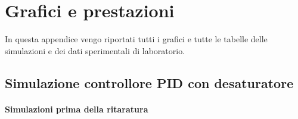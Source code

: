 \section{Grafici e prestazioni}
\label{app:grafici}

	In questa appendice vengo riportati tutti i grafici e tutte le tabelle delle simulazioni e dei dati sperimentali di laboratorio.
	
	\subsection{Simulazione controllore PID con desaturatore}
	\label{subapp:PIDsimulazione}
	
		\paragraph{Simulazioni prima della ritaratura}
		
			\begin{center}
				 
			\end{center}	
			
			\begin{center}
				 
			\end{center}